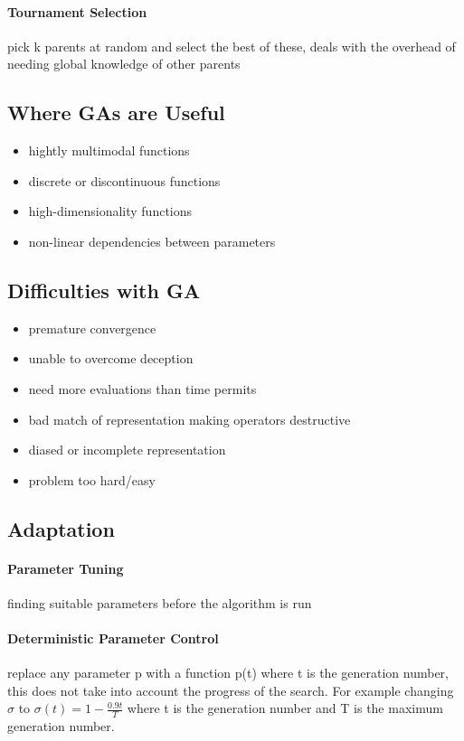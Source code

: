 \documentclass[12pt]{article}
\begin{document}
\paragraph{Tournament Selection} 
pick k parents at random and select the best of these, deals with the overhead of needing global knowledge of other parents

\subsection*{Where GAs are Useful}
\begin{itemize}
	\item hightly multimodal functions
	\item discrete or discontinuous functions
	\item high-dimensionality functions
	\item non-linear dependencies between parameters
\end{itemize}

\subsection*{Difficulties with GA}
\begin{itemize}
	\item premature convergence
	\item unable to overcome deception
	\item need more evaluations than time permits
	\item bad match of representation making operators destructive
	\item diased or incomplete representation
	\item problem too hard/easy
\end{itemize}

\subsection*{Adaptation}
\paragraph{Parameter Tuning} 
finding suitable parameters before the algorithm is run

\paragraph{Deterministic Parameter Control} 
replace any parameter p with a function p(t) where t is the generation number, this does not take into account the progress of the search. For example changing $\sigma$ to $\sigma(t) = 1-\frac{0.9t}{T}$ where t is the generation number and T is the maximum generation number.
\end{document}

